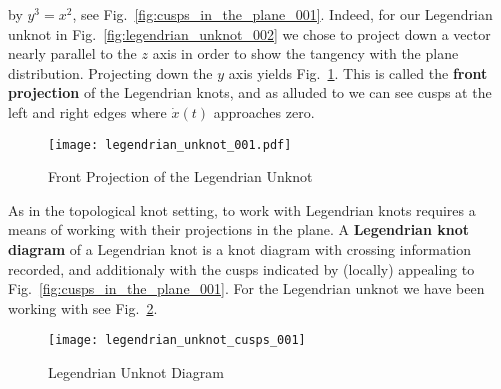     by $y^{3}=x^{2}$, see Fig.~\ref{fig:cusps_in_the_plane_001}.
    Indeed, for our Legendrian unknot in Fig.~\ref{fig:legendrian_unknot_002}
    we chose to project down a vector nearly parallel to the $z$ axis in order
    to show the tangency with the plane distribution. Projecting down the
    $y$ axis yields Fig.~\ref{fig:legendrian_unknot_001}. This is called the
    \textbf{front projection} of the Legendrian knots, and as alluded to we can
    see cusps at the left and right edges where $\dot{x}(t)$ approaches zero.
    \begin{figure}
        \centering
        \texttt{[image: legendrian\_unknot\_001.pdf]}
        \caption{Front Projection of the Legendrian Unknot}
        \label{fig:legendrian_unknot_001}
    \end{figure}
    \par\hfill\par
    As in the topological knot setting, to work with Legendrian knots requires
    a means of working with their projections in the plane. A
    \textbf{Legendrian knot diagram} of a Legendrian knot is a knot diagram
    with crossing information recorded, and additionaly with the cusps indicated
    by (locally) appealing to Fig.~\ref{fig:cusps_in_the_plane_001}. For
    the Legendrian unknot we have been working with see
    Fig.~\ref{fig:legendrian_unknot_cusps_001}.
    \begin{figure}
        \centering
        \texttt{[image: legendrian\_unknot\_cusps\_001]}
        \caption{Legendrian Unknot Diagram}
        \label{fig:legendrian_unknot_cusps_001}
    \end{figure}

